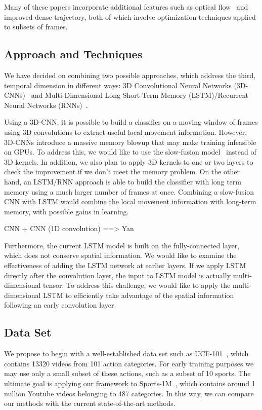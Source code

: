 Many of these papers incorporate additional features such as optical flow~\cite{brox} and improved dense trajectory, both of which involve optimization techniques applied to subsets of frames. 
\subsection*{Approach and Techniques}
We have decided on combining two possible approaches, which address
the third, temporal dimension in different ways: 3D Convolutional Neural
Networks (3D-CNNs)~\cite{stf,cnnvid} and Multi-Dimensional Long
Short-Term Memory (LSTM)/Recurrent Neural Networks (RNNs)~\cite{ltrcn}. 

Using a 3D-CNN, it is possible to build a classifier on a moving window
of frames using 3D convolutions to extract useful local movement information. However, 3D-CNNs introduce a massive memory blowup that may make training infeasible on GPUs.
To address this, we would like to use the slow-fusion model~\cite{cnnvid} instead of 3D kernels. In addition, we also plan to apply 3D kernels to one or two layers to check the improvement if we don't meet the memory problem. On the other hand, an LSTM/RNN approach is able to build the classifier with long term memory using a much larger number of frames at once. Combining a slow-fusion CNN with LSTM would combine the local movement information with long-term memory, with possible gains in learning.

CNN + CNN (1D convolution) ==> Yan

Furthermore, the current LSTM model is built on the fully-connected
layer, which does not conserve spatial information. We would like to examine the 
effectiveness of adding the LSTM network at earlier layers.
If we apply LSTM directly after the convolution layer,
the input to LSTM model is actually multi-dimensional tensor. To address
this challenge, we would like to apply the multi-dimensional LSTM
\cite{byeon2015scene} to efficiently take advantage of the spatial
information following an early convolution layer. 

\subsection*{Data Set}
We propose to begin with a well-established data set such as UCF-101~\cite{ucf101}, which contains 13320 videos from 101 action categories. For early training purposes we may use only a small subset of these actions, such as a subset of 10 sports. The ultimate goal is applying our framework to Sports-1M~\cite{cnnvid}, which contains around 1 million Youtube videos belonging to 487 categories. In this way, we can compare our methods with the current state-of-the-art methods.

